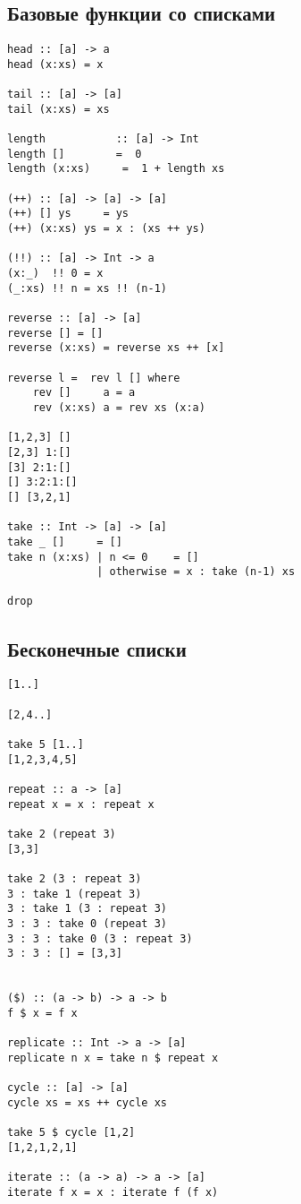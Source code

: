 \documentclass[a4paper,10pt]{article}
\begin{document}
\subsection{Базовые функции со списками}
\begin{lstlisting}
head :: [a] -> a
head (x:xs) = x

tail :: [a] -> [a]
tail (x:xs) = xs

length           :: [a] -> Int
length []        =  0
length (x:xs)     =  1 + length xs

(++) :: [a] -> [a] -> [a]
(++) [] ys     = ys
(++) (x:xs) ys = x : (xs ++ ys)

(!!) :: [a] -> Int -> a
(x:_)  !! 0 = x
(_:xs) !! n = xs !! (n-1)

reverse :: [a] -> [a]
reverse [] = []
reverse (x:xs) = reverse xs ++ [x]

reverse l =  rev l [] where
    rev []     a = a
    rev (x:xs) a = rev xs (x:a)

[1,2,3] []
[2,3] 1:[]
[3] 2:1:[]
[] 3:2:1:[]
[] [3,2,1]

take :: Int -> [a] -> [a]
take _ []     = []
take n (x:xs) | n <= 0    = []
              | otherwise = x : take (n-1) xs

drop

\end{lstlisting}

\subsection{Бесконечные списки}
\begin{lstlisting}
[1..]

[2,4..]

take 5 [1..]
[1,2,3,4,5]

repeat :: a -> [a]
repeat x = x : repeat x

take 2 (repeat 3)
[3,3]

take 2 (3 : repeat 3)
3 : take 1 (repeat 3)
3 : take 1 (3 : repeat 3)
3 : 3 : take 0 (repeat 3)
3 : 3 : take 0 (3 : repeat 3)
3 : 3 : [] = [3,3]


($) :: (a -> b) -> a -> b
f $ x = f x

replicate :: Int -> a -> [a]
replicate n x = take n $ repeat x

cycle :: [a] -> [a]
cycle xs = xs ++ cycle xs

take 5 $ cycle [1,2]
[1,2,1,2,1]

iterate :: (a -> a) -> a -> [a]
iterate f x = x : iterate f (f x)
\end{lstlisting}
\end{document}
